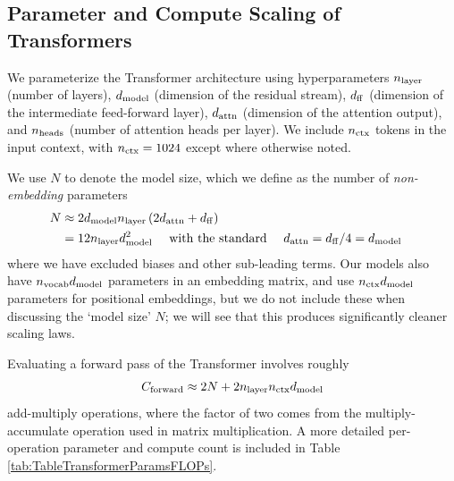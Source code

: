 \documentclass[english]{article}
\newcommand{\be}{\begin{equation}}
\newcommand{\ee}{\end{equation}}
\begin{document}
\subsection{Parameter and Compute Scaling of Transformers}
\label{sec:ParameterComputeCounts}

We parameterize the Transformer architecture using hyperparameters $n_{\rm layer}$ (number of layers), $d_{{\rm model}}$ (dimension of the residual stream), $d_{\rm ff}$ (dimension of the intermediate feed-forward layer), $d_{\rm attn}$ (dimension of the attention output), and $n_{\rm heads}$ (number of attention heads per layer).  We include $n_{\rm ctx}$ tokens in the input context, with $n_{\rm ctx} = 1024$ except where otherwise noted.

We use $N$ to denote the model size, which we define as the number of \emph{non-embedding} parameters
\begin{align}
\label{eq:ModelSizeDefinition}
N & \approx  2d_{{\rm model}}n_{{\rm layer}}\left(2d_{{\rm attn}}+d_{{\rm ff}}\right) & \nonumber \\
& = 12 n_{\rm layer} d_{{\rm model}}^2 \quad \text{ with the standard } \quad d_{\rm attn} = d_{\rm ff}/4 = d_{{\rm model}} &
\end{align}
where we have excluded biases and other sub-leading terms.
Our models also have $n_{\rm vocab} d_{{\rm model}}$ parameters in an embedding matrix, and use $n_{\rm ctx} d_{{\rm model}}$ parameters for positional embeddings, but we do not include these when discussing the `model size' $N$; we will see that this produces significantly cleaner scaling laws.

Evaluating a forward pass of the Transformer involves roughly
\be
\label{eq:ApproximateTotalCompute}
C_{\rm forward} \approx 2N + 2n_{{\rm layer}}n_{{\rm ctx}}d_{{\rm model}}
\ee
add-multiply operations, where the factor of two comes from the multiply-accumulate operation used in matrix multiplication.  A more detailed per-operation parameter and compute count is included in Table \ref{tab:TableTransformerParamsFLOPs}.
\end{document}
